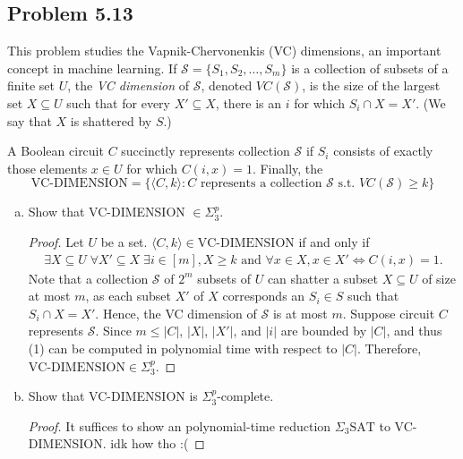 \documentclass[a4paper]{article}
\begin{document}
\subsection*{Problem 5.13}

This problem studies the Vapnik-Chervonenkis (VC) dimensions, an important concept in machine
learning. If $\mathcal{S} = \{S_1, S_2, \ldots, S_m\}$ is a collection of subsets of a finite set
$U$, the \textit{VC dimension} of $\mathcal{S}$, denoted $VC(\mathcal{S})$, is the size of the
largest set $X \subseteq U$ such that for every $X' \subseteq X$, there is an $i$ for which $S_i
\cap X = X'$. (We say that $X$ is shattered by $S$.)

A Boolean circuit $C$ succinctly represents collection $\mathcal{S}$ if $S_i$ consists of exactly
those elements $x \in U$ for which $C(i, x) = 1$. Finally, the
\[
  \text{VC-DIMENSION} = \{\langle C, k \rangle : C \text{ represents a collection } \mathcal{S} \text{ s.t. } VC(\mathcal{S}) \geq k\}
\]
\begin{enumerate}[(a)]
  \item Show that VC-DIMENSION $\in \Sigma_3^p$.
  \begin{proof}
    Let $U$ be a set. $\langle C, k \rangle \in \text{VC-DIMENSION}$ if and only if
    \begin{gather}
      \exists X \subseteq U \; \forall X' \subseteq X \; \exists i \in [m], X \geq k \text{ and } \forall x \in X, x \in X' \Leftrightarrow C(i, x) = 1.
    \end{gather}
    Note that a collection $\mathcal{S}$ of $2^m$ subsets of $U$ can shatter a subset $X \subseteq
    U$ of size at most $m$, as each subset $X'$ of $X$ corresponds an $S_i \in S$ such that $S_i
    \cap X = X'$. Hence, the VC dimension of $\mathcal{S}$ is at most $m$. Suppose circuit $C$
    represents $\mathcal{S}$. Since $m \leq |C|$, $|X|$, $|X'|$, and $|i|$ are bounded by $|C|$, and
    thus (1) can be computed in polynomial time with respect to $|C|$. Therefore,
    $\text{VC-DIMENSION} \in \Sigma_3^p$.
  \end{proof}
  \item Show that VC-DIMENSION is $\Sigma_3^p$-complete.
  \begin{proof}
    It suffices to show an polynomial-time reduction $\Sigma_3\text{SAT}$ to VC-DIMENSION. idk how
    tho :( 
  \end{proof}
\end{enumerate}
\end{document}
